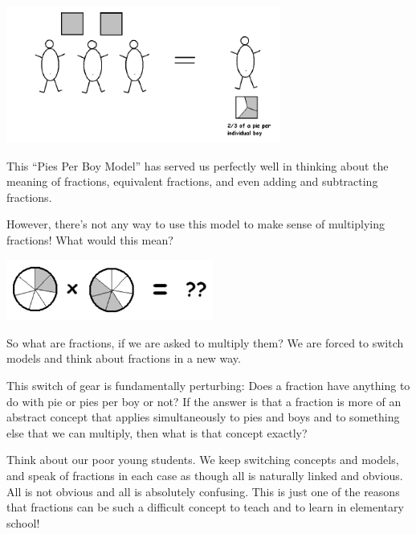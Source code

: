    \begin{center}
\includegraphics[height = 4.5cm]{2pies3boys2}
\end{center}


This ``Pies Per Boy Model'' has served us perfectly well in thinking about the meaning of fractions, equivalent fractions, and even adding and subtracting fractions. 

However, there's not any way to use this model to make sense of multiplying fractions!  What would this mean?

   \begin{center}
\includegraphics[height = 2cm]{PPBtimes}
\end{center}

So what are fractions, if we are  asked to multiply them?  We are forced to switch models and think about fractions in a new way.

 This switch of gear is fundamentally perturbing: Does a fraction have anything to do with pie or pies per boy or not? If the answer is that a fraction is more of an abstract concept that applies simultaneously to pies and boys and to something else that we can multiply, then what is that concept exactly? 

Think about our poor young students. We keep switching concepts and models, and speak of fractions in each case as though all is naturally linked and obvious. All is not obvious and all is absolutely confusing.
 This is just one of the reasons that fractions can be such a difficult concept to teach and to learn in elementary school!


